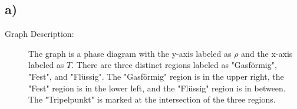 

\subsection*{a)}

\begin{description}
    \item[Graph Description:] The graph is a phase diagram with the y-axis labeled as $\rho$ and the x-axis labeled as $T$. There are three distinct regions labeled as "Gasförmig", "Fest", and "Flüssig". The "Gasförmig" region is in the upper right, the "Fest" region is in the lower left, and the "Flüssig" region is in between. The "Tripelpunkt" is marked at the intersection of the three regions.
\end{description}